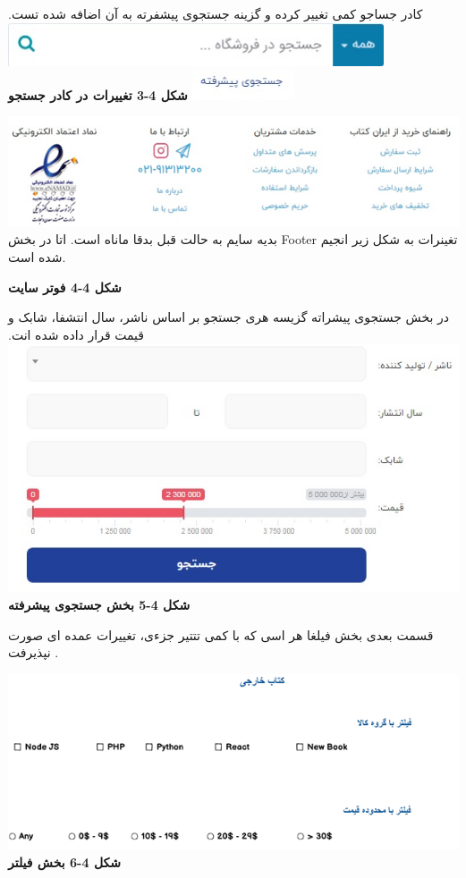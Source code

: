 \documentclass[13pt]{article}
\begin{document}
کادر جساجو کمی تغییر کرده و گزینه جستجوی پیشفرته به آن اضافه شده تست.
\includegraphics[width=315pt]{img-12.png}{\large  }\includegraphics[width=85pt]{img-13.png}{\large  }
\textbf{{\footnotesize شکل 4-3 تغییرات در کادر جستجو}}

\includegraphics[width=451pt]{img-14.png} بدیه سایم به حالت قبل بدقا ماناه است.
اتا در بخش Footer تغینرات به شکل زیر انجیم شده است.

\textbf{{\footnotesize شکل 4-4 فوتر سایت}}

در بخش \guillemotleft{}جستجوی پیشراته\guillemotright{} گزیسه هری جستجو بر اساس
ناشر، سال انتشفا، شابک و قیمت قرار داده شده انت.
\includegraphics[width=435pt]{img-4.png}{\large  }
\textbf{{\footnotesize شکل 4-5 بخش جستجوی پیشرفته}}

قسمت بعدی بخش \guillemotleft{}فیلغا هر\guillemotright{} اسی که با کمی تتتیر
جزءی، تغییرات عمده ای صورت نپذیرفت .

\includegraphics[width=451pt]{img-15.png}\textbf{{\footnotesize  شکل 4-6 بخش
فیلتر}}
\end{document}
